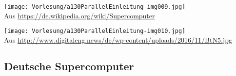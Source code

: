 \begin{center}
\texttt{[image: Vorlesung/a130ParallelEinleitung-img009.jpg]}\\
Aus \url{https://de.wikipedia.org/wiki/Supercomputer}
\end{center}

\begin{center}
\texttt{[image: Vorlesung/a130ParallelEinleitung-img010.jpg]}\\
Aus \url{http://www.digitaleng.news/de/wp-content/uploads/2016/11/BtN5.jpg} 
\end{center}


\subsection{Deutsche Supercomputer}
